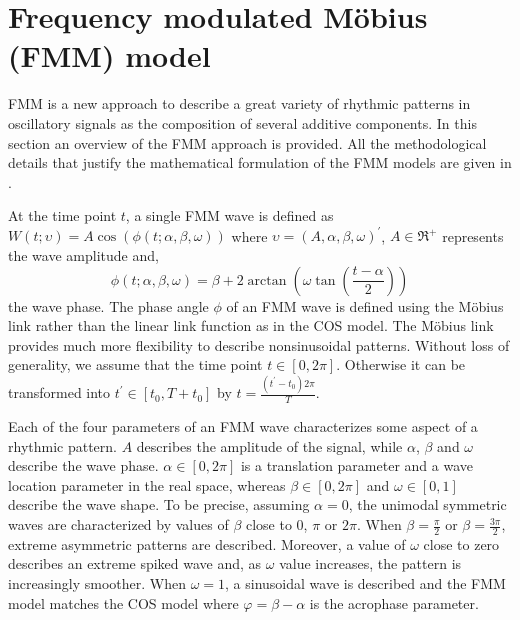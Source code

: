 \section{Frequency modulated M\"obius (FMM) model} \label{sec:models}
FMM is a new approach to describe a great variety of rhythmic patterns in oscillatory signals as the composition of several additive components. In this section an overview of the FMM approach is provided. All the methodological details that justify the mathematical formulation of the FMM models are given in \cite{Rueda+Larriba+Peddada:2019}.

At the time point $t$, a single FMM wave is defined as $ W\left(t; \upsilon\right) = A \cos\left(\phi\left(t; \alpha, \beta, \omega\right)\right)$ where $\upsilon = \left(A, \alpha, \beta, \omega\right)^{\prime} $, $A \in \Re^{+}$ represents the wave amplitude and, 
%
\begin{equation} \label{eq:phase}
  \phi\left(t; \alpha, \beta, \omega\right)= \beta + 2\arctan\left(\omega \tan\left(\frac{t - \alpha}{2}\right)\right)
\end{equation}
%
the wave phase. The phase angle $\phi$ of an FMM wave is defined using the M\"obius link \citep[see][]{Downs+Mardia:2002, Kato+Shimizu+Shieh:2008} rather than the linear link function as in the COS model. The M\"obius link provides much more flexibility to describe nonsinusoidal patterns. 
Without loss of generality, we assume that the time point $t \in \left[0, 2\pi\right]$. Otherwise it can be transformed into $t^{\prime} \in \left[t_0, T + t_0\right]$ by $t = \frac{\left(t^{\prime} - t_0\right)2\pi}{T}$.

Each of the four parameters of an FMM wave characterizes some aspect of a rhythmic pattern. $A$ describes the amplitude of the signal, while $\alpha$, $\beta$ and $\omega$ describe the wave phase. $\alpha \in \left[0, 2\pi\right]$ is a translation parameter and a wave location parameter in the real space, whereas $\beta \in \left[0, 2\pi\right]$ and $\omega \in \left[0, 1\right]$ describe the wave shape. To be precise, assuming $\alpha = 0$, the unimodal symmetric waves are characterized by values of $\beta$ close to $0$, $\pi$ or $2\pi$. When $\beta = \frac{\pi}{2}$ or $\beta = \frac{3\pi}{2}$, extreme asymmetric patterns are described. Moreover, a value of $\omega$ close to zero describes an extreme spiked wave and, as $\omega$ value increases, the pattern is increasingly smoother. When $\omega = 1$, a sinusoidal wave is described and the FMM model matches the COS model where $\varphi = \beta - \alpha$ is the acrophase parameter. 


